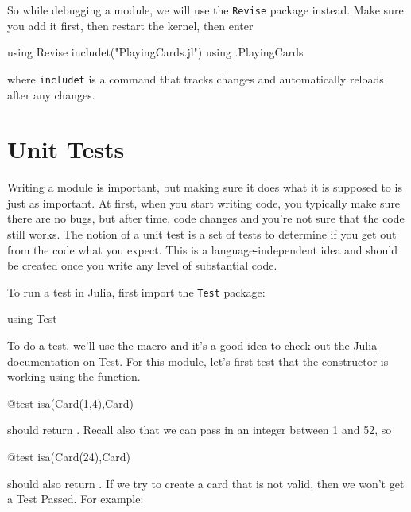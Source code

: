 So while debugging a module, we will use the \texttt{Revise} package instead. Make sure you add it first, then restart the kernel, then enter

\begin{jlverbatim}
using Revise
includet("PlayingCards.jl")
using .PlayingCards
\end{jlverbatim}
%
where \texttt{includet} is a command that tracks changes and automatically reloads after any changes.



\section{Unit Tests}\label{unit-tests}

Writing a module is important, but making sure it does what it is
supposed to is just as important. At first, when you start writing code,
you typically make sure there are no bugs, but after time, code changes
and you're not sure that the code still works. The notion of a unit test
is a set of tests to determine if you get out from the code what you
expect. This is a language-independent idea and should be created once
you write any level of substantial code.

To run a test in Julia, first import the \texttt{Test} package:

\begin{jlblock}[modules]
using Test
\end{jlblock}

To do a test, we'll use the  macro and it's a good idea to check out the \href{https://docs.julialang.org/en/latest/stdlib/Test/}{Julia documentation on Test}. For this module, let's first test that the constructor is working using the  function.

\begin{jlblock}[modules]
@test isa(Card(1,4),Card)
\end{jlblock}
%
should return  \printpythontex[verb].  Recall also that we can pass in an integer between 1 and 52, so

\begin{jlblock}[modules]
@test isa(Card(24),Card)
\end{jlblock}
%
should also return  \printpythontex[verb]. If we try to create a card that is not valid, then we won't get a Test Passed. For example:

